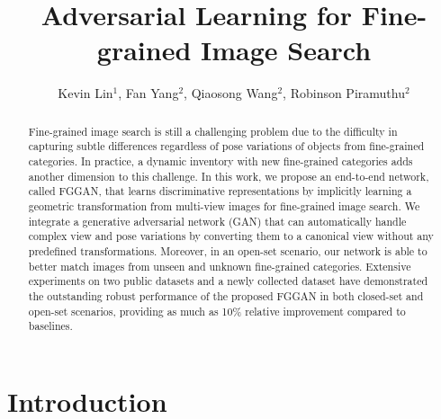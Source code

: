 \documentclass[runningheads]{llncs}
\begin{document}
\pagestyle{headings}
\mainmatter

\title{Adversarial Learning for Fine-grained Image Search} %




\author{Kevin Lin$^1$, Fan Yang$^2$, Qiaosong Wang$^2$, Robinson Piramuthu$^2$}

\maketitle

\begin{abstract}
Fine-grained image search is still a challenging problem due to the difficulty in capturing subtle differences regardless of pose variations of objects from fine-grained categories. In practice, a dynamic inventory with new fine-grained categories adds another dimension to this challenge.
In this work, we propose an end-to-end network, called FGGAN, that learns discriminative representations by implicitly learning a geometric transformation from multi-view images for fine-grained image search. 
We integrate a generative adversarial network (GAN) that can automatically handle complex view and pose variations by converting them to a canonical view without any predefined transformations. 
Moreover, in an open-set scenario, our network is able to better match  images from unseen and unknown fine-grained categories.
Extensive experiments on two public datasets and a newly collected dataset have demonstrated the outstanding robust performance of the proposed FGGAN in both closed-set and open-set scenarios, providing as much as 10\% relative improvement compared to baselines.

\end{abstract}

\section{Introduction}\label{sec:intro}
\end{document}
